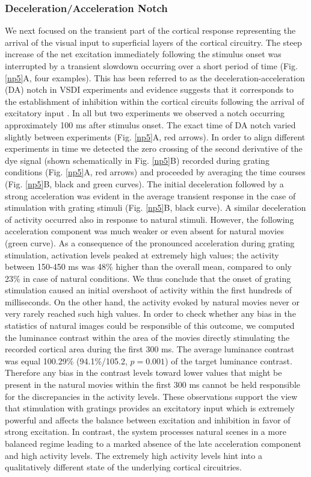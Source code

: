 \subsubsection{Deceleration/Acceleration Notch}

We next focused on the transient part of the cortical response representing
the arrival of the visual input to superficial layers of the cortical
circuitry. The steep increase of the net excitation immediately following
the stimulus onset was interrupted by a transient slowdown occurring over a
short period of time (Fig. \ref{np5}A, four examples). This has been
referred to as the deceleration-acceleration (DA)
notch in VSDI experiments
and evidence suggests that it corresponds to the establishment of
inhibition within the cortical circuits following the arrival of excitatory
input \citep{sharon2002a}. In all but two experiments we observed a notch
occurring approximately 100 ms after stimulus onset. The exact time of DA
notch varied slightly between experiments (Fig. \ref{np5}A, red arrows). In
order to align different experiments in time we detected the zero crossing
of the second derivative of the dye signal (shown schematically in Fig.
\ref{np5}B) recorded during grating conditions (Fig. \ref{np5}A, red
arrows) and proceeded by averaging the time courses (Fig. \ref{np5}B, black
and green curves). The initial deceleration followed by a strong
acceleration was evident in the average transient response in the case of
stimulation with grating stimuli (Fig. \ref{np5}B, black curve). A similar
deceleration of activity occurred also in response to natural stimuli.
However, the following acceleration component was much weaker or even
absent for natural movies (green curve). As a consequence of the pronounced
acceleration during grating stimulation, activation levels peaked at
extremely high values; the activity between 150-450 ms was 48\% higher than
the overall mean, compared to only 23\% in case of natural conditions. We
thus conclude that the onset of grating stimulation caused an initial
overshoot of activity within the first hundreds of milliseconds. On the
other hand, the activity evoked by natural movies never or very rarely
reached such high values. In order to check whether any bias in the
statistics of natural images could be responsible of this outcome, we
computed the luminance contrast within the area of the movies directly
stimulating the recorded cortical area during the first 300 ms. The average
luminance contrast was equal 100.29\% (94.1\%/105.2, $p = 0.001$) of the
target luminance contrast. Therefore any bias in the contrast levels toward
lower values that might be present in the natural movies within the first
300 ms cannot be held responsible for the discrepancies in the activity
levels. These observations support the view that stimulation with gratings
provides an excitatory input which is extremely powerful and affects the
balance between excitation and inhibition in favor of strong excitation. In
contrast, the system processes natural scenes in a more balanced regime
leading to a marked absence of the late acceleration component and high
activity levels. The extremely high activity levels hint into a
qualitatively different state of the underlying cortical circuitries.

